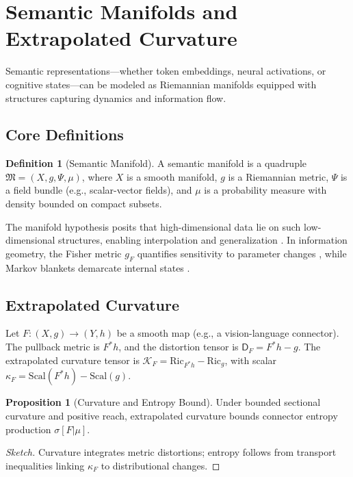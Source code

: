 \documentclass{article}
\theoremstyle{definition}
\newtheorem{definition}{Definition}[section]
\newtheorem{proposition}[theorem]{Proposition}
\begin{document}
\section{Semantic Manifolds and Extrapolated Curvature}
Semantic representations—whether token embeddings, neural activations, or cognitive states—can be modeled as Riemannian manifolds equipped with structures capturing dynamics and information flow.

\subsection{Core Definitions}
\begin{definition}[Semantic Manifold]
A semantic manifold is a quadruple $\mathfrak{M} = (X, g, \Psi, \mu)$, where $X$ is a smooth manifold, $g$ is a Riemannian metric, $\Psi$ is a field bundle (e.g., scalar-vector fields), and $\mu$ is a probability measure with density bounded on compact subsets.
\end{definition}

The manifold hypothesis \cite{fefferman2016testing,gorban2018blessing} posits that high-dimensional data lie on such low-dimensional structures, enabling interpolation and generalization \cite{chollet2021deep}. In information geometry, the Fisher metric $g_F$ quantifies sensitivity to parameter changes \cite{caticha2015geometry}, while Markov blankets demarcate internal states \cite{kirchhoff2018markov}.

\subsection{Extrapolated Curvature}
Let $F: (X, g) \to (Y, h)$ be a smooth map (e.g., a vision-language connector). The pullback metric is $F^* h$, and the distortion tensor is $\mathsf{D}_F = F^* h - g$. The extrapolated curvature tensor is $\mathcal{K}_F = \mathrm{Ric}_{F^* h} - \mathrm{Ric}_g$, with scalar $\kappa_F = \mathrm{Scal}(F^* h) - \mathrm{Scal}(g)$.

\begin{proposition}[Curvature and Entropy Bound]
Under bounded sectional curvature and positive reach, extrapolated curvature bounds connector entropy production $\sigma[F|\mu]$.
\end{proposition}

\begin{proof}[Sketch]
Curvature integrates metric distortions; entropy follows from transport inequalities linking $\kappa_F$ to distributional changes.
\end{proof}
\end{document}
